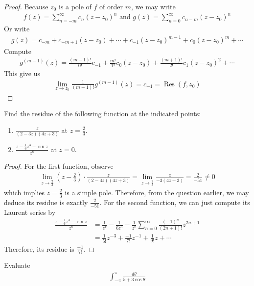 \documentclass{report}
\begin{document}
\begin{proof}
Because $z_0$ is a pole of $f$ of order $m$, we may write 
 \begin{align*}
f(z)=\sum_{n=-m}^\infty c_n (z-z_0)^n\text{ and }g(z)=\sum_{n=0}^{\infty} c_{n-m}(z-z_0)^n
\end{align*}
Or write 
\begin{align*}
  g(z)= c_{-m}+c_{-m+1} (z-z_0)   + \cdots + c_{-1}(z-z_0)^{m-1} + c_0(z-z_0)^m +\cdots 
\end{align*}
Compute 
\begin{align*}
g^{(m-1)}(z)= \frac{(m-1)!}{0!}c_{-1}+\frac{m!}{1!}c_0(z-z_0)+ \frac{(m+1)!}{2!}c_1(z-z_0)^2 + \cdots  
\end{align*}
This give us 
\begin{align*}
\lim_{z\to z_0} \frac{1}{(m-1)!}g^{(m-1)}(z)= c_{-1}= \operatorname{Res}(f,z_0)
\end{align*}
\end{proof}
\begin{question}{}{}
Find the residue of the following function at the indicated points: 
\begin{enumerate}[label=(\alph*)]
  \item $\frac{z}{(2-3z)(4z+3)}$ at $z= \frac{2}{3}$. 
  \item $\frac{z-\frac{1}{6}z^3 - \sin z}{z^8}$ at $z=0$. 
\end{enumerate}
\end{question}
\begin{proof}
For the first function, observe  
\begin{align*}
\lim_{z\to \frac{2}{3}} (z- \frac{2}{3}) \cdot \frac{z}{(2-3z)(4z+3)}= \lim_{z\to \frac{2}{3}}\frac{z}{-3(4z+3)}= \frac{2}{-51}\neq 0
\end{align*}
which implies $z=\frac{2}{3}$ is a simple pole. Therefore, from the question earlier, we may deduce its residue is exactly $\frac{2}{-51}$. For the second function, we can just compute its Laurent series by 
\begin{align*}
\frac{z- \frac{1}{6}z^3- \sin z}{z^8}&= \frac{1}{z^7}- \frac{1}{6z^5} - \frac{1}{z^8}\sum_{n=0}^{\infty}  \frac{(-1)^n}{(2n+1)!}z^{2n+1} \\
&=\frac{1}{5!}z^{-3}+ \frac{-1}{7!}z^{-1}+ \frac{1}{9!}z + \cdots 
\end{align*}
Therefore, its residue is $\frac{-1}{7!}$. 
\end{proof}
\begin{question}{}{}
Evaluate 
\begin{align*}
\int_{-\pi }^{\pi } \frac{d\theta}{5+ 3 \cos \theta}
\end{align*}
\end{question}
\end{document}
